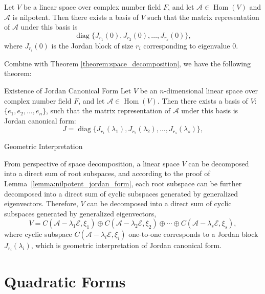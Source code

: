 \documentclass[11pt]{../../TexTemplate/elegantbook} %
\begin{document}
\begin{lemma}\label{lemma:nilpotent_jordan_form}
    Let \( V \) be a linear space over complex number field \( F \), 
    and let \( \mathcal{A}\in \operatorname{Hom}(V) \) and \(\mathcal{A}\) is nilpotent.
    Then there exists a basis of \( V \) such that 
    the matrix representation of \( \mathcal{A} \) under this basis is
    \[
    \operatorname{diag}\{ J_{r_{1}}(0), J_{r_{2}}(0), \ldots, J_{r_{s}}(0) \},
    \]
    where \( J_{r_{i}}(0) \) is the Jordan block of size \( r_i \) corresponding to eigenvalue \( 0 \).
\end{lemma}
Combine with Theorem \ref{theorem:space_decomposition}, we have the following theorem:
\begin{theorem}{Existence of Jordan Canonical Form}
    Let \( V \) be an \( n \)-dimensional linear space over complex number field \( F \),
    and let \( \mathcal{A}\in \operatorname{Hom}(V) \).
    Then there exists a basis of \( V \): \(\{ e_{1}, e_{2}, \ldots, e_{n} \}\),
    such that the matrix representation of \( \mathcal{A} \) under this basis is Jordan canonical form:
    \[
    J = \operatorname{diag}\{ J_{r_{1}}(\lambda_{1}), J_{r_{2}}(\lambda_{2}), \ldots, J_{r_{s}}(\lambda_{s}) \},
    \]
\end{theorem}

\begin{leftbarTitle}{Geometric Interpretation}\end{leftbarTitle} %
From perspective of space decomposition, a linear space \( V \) can be decomposed into a direct sum of root subspaces,
and according to the proof of Lemma~\ref{lemma:nilpotent_jordan_form},
each root subspace can be further decomposed into a direct sum of cyclic subspaces generated by generalized eigenvectors.
Therefore, \(V\) can be decomposed into a direct sum of cyclic subspaces generated by generalized eigenvectors,
\[
V = C(\mathcal{A}-\lambda_{1}\mathcal{E}, \xi_{1}) \oplus C(\mathcal{A}-\lambda_{2}\mathcal{E}, \xi_{2}) \oplus \cdots \oplus 
C(\mathcal{A}-\lambda_{s}\mathcal{E}, \xi_{s}),
\]
where cyclic subspace \( C(\mathcal{A}-\lambda_{i}\mathcal{E}, \xi_{i}) \) one-to-one corresponds to 
a Jordan block \( J_{r_{i}}(\lambda_{i}) \), which is geometric interpretation of Jordan canonical form.

\chapter{Quadratic Forms}
\end{document}
